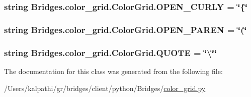 \subsubsection[{O\+P\+E\+N\+\_\+\+C\+U\+R\+L\+Y}]{\setlength{\rightskip}{0pt plus 5cm}string Bridges.\+color\+\_\+grid.\+Color\+Grid.\+O\+P\+E\+N\+\_\+\+C\+U\+R\+L\+Y = \char`\"{}\{\char`\"{}\hspace{0.3cm}{\ttfamily [static]}}\label{class_bridges_1_1color__grid_1_1_color_grid_a1f379a6c0e9fc4db2045e52678f15e20}
\hypertarget{class_bridges_1_1color__grid_1_1_color_grid_abde748d9ceae5339a3724b7064eee054}{}
\subsubsection[{O\+P\+E\+N\+\_\+\+P\+A\+R\+E\+N}]{\setlength{\rightskip}{0pt plus 5cm}string Bridges.\+color\+\_\+grid.\+Color\+Grid.\+O\+P\+E\+N\+\_\+\+P\+A\+R\+E\+N = \char`\"{}(\char`\"{}\hspace{0.3cm}{\ttfamily [static]}}\label{class_bridges_1_1color__grid_1_1_color_grid_abde748d9ceae5339a3724b7064eee054}
\hypertarget{class_bridges_1_1color__grid_1_1_color_grid_a1db881c79ab55a95c4c15dee31a1e431}{}
\subsubsection[{Q\+U\+O\+T\+E}]{\setlength{\rightskip}{0pt plus 5cm}string Bridges.\+color\+\_\+grid.\+Color\+Grid.\+Q\+U\+O\+T\+E = \char`\"{}\textbackslash{}\char`\"{}\char`\"{}\hspace{0.3cm}{\ttfamily [static]}}\label{class_bridges_1_1color__grid_1_1_color_grid_a1db881c79ab55a95c4c15dee31a1e431}


The documentation for this class was generated from the following file\+:\begin{DoxyCompactItemize}
\item 
/\+Users/kalpathi/gr/bridges/client/python/\+Bridges/\hyperlink{color__grid_8py}{color\+\_\+grid.\+py}\end{DoxyCompactItemize}
